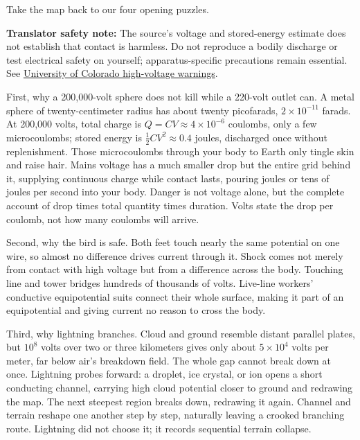 
\begin{mainline}
Take the map back to our four opening puzzles.

\textbf{Translator safety note:} The source's voltage and stored-energy estimate does not establish that contact is harmless. Do not reproduce a bodily discharge or test electrical safety on yourself; apparatus-specific precautions remain essential. See \href{https://physicslabs.colorado.edu/demos/electricity-and-magnetism/electrostatics/electrostatic-machines/dissectible-van-de-graaff/}{University of Colorado high-voltage warnings}.

First, why a 200,000-volt sphere does not kill while a 220-volt outlet can. A metal sphere of twenty-centimeter radius has about twenty picofarads, \(2\times10^{-11}\) farads. At 200,000 volts, total charge is \(Q=CV\approx 4\times10^{-6}\) coulombs, only a few microcoulombs; stored energy is \(\frac12 CV^2\approx 0.4\) joules, discharged once without replenishment. Those microcoulombs through your body to Earth only tingle skin and raise hair. Mains voltage has a much smaller drop but the entire grid behind it, supplying continuous charge while contact lasts, pouring joules or tens of joules per second into your body. Danger is not voltage alone, but the complete account of drop times total quantity times duration. Volts state the drop per coulomb, not how many coulombs will arrive.

Second, why the bird is safe. Both feet touch nearly the same potential on one wire, so almost no difference drives current through it. Shock comes not merely from contact with high voltage but from a difference across the body. Touching line and tower bridges hundreds of thousands of volts. Live-line workers' conductive equipotential suits connect their whole surface, making it part of an equipotential and giving current no reason to cross the body.

Third, why lightning branches. Cloud and ground resemble distant parallel plates, but \(10^{8}\) volts over two or three kilometers gives only about \(5\times10^{4}\) volts per meter, far below air's breakdown field. The whole gap cannot break down at once. Lightning probes forward: a droplet, ice crystal, or ion opens a short conducting channel, carrying high cloud potential closer to ground and redrawing the map. The next steepest region breaks down, redrawing it again. Channel and terrain reshape one another step by step, naturally leaving a crooked branching route. Lightning did not choose it; it records sequential terrain collapse.


\end{mainline}
